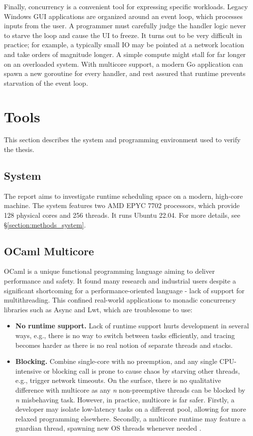 \documentclass[12pt,a4paper,twoside]{report}
\begin{document}
Finally, concurrency is a convenient tool for expressing specific workloads. Legacy Windows GUI applications are organized around an event loop, which processes inputs from the user. A programmer must carefully judge the handler logic never to starve the loop and cause the UI to freeze. It turns out to be very difficult in practice; for example, a typically small IO may be pointed at a network location and take orders of magnitude longer. A simple compute might stall for far longer on an overloaded system. With multicore support, a modern Go application can spawn a new goroutine for every handler, and rest assured that runtime prevents starvation of the event loop.  

\section{Tools}
This section describes the system and programming environment used to verify the thesis.  

\subsection{System}
The report aims to investigate runtime scheduling space on a modern, high-core machine. The system features two AMD EPYC 7702 processors, which provide 128 physical cores and 256 threads. It runs Ubuntu 22.04. For more details, see \S\ref{section:methods_system}. 

\subsection{OCaml Multicore}
\label{section:intr_ocaml-multicore}

OCaml is a unique functional programming language aiming to deliver performance and safety. It found many research and industrial users despite a significant shortcoming for a performance-oriented language - lack of support for multithreading. This confined real-world applications to monadic concurrency libraries such as Async and Lwt, which are troublesome to use: 
\begin{itemize}
    \item \textbf{No runtime support.} Lack of runtime support hurts development in several ways, e.g., there is no way to switch between tasks efficiently, and tracing becomes harder as there is no real notion of separate threads and stacks. 
    \item \textbf{Blocking.} Combine single-core with no preemption, and any single CPU-intensive or blocking call is prone to cause chaos by starving other threads, e.g., trigger network timeouts. On the surface, there is no qualitative difference with multicore as any \textit{n} non-preemptive threads can be blocked by \textit{n} misbehaving task. However, in practice, multicore is far safer. Firstly, a developer may isolate low-latency tasks on a different pool, allowing for more relaxed programming elsewhere. Secondly, a multicore runtime may feature a guardian thread, spawning new OS threads whenever needed \cite{golang}.
\end{itemize}
\end{document}
